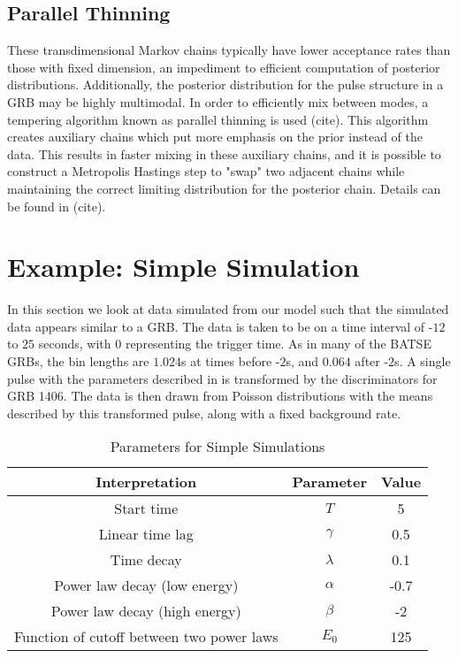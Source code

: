\documentclass[12pt,letterpaper]{article}
\begin{document}


    

   
    \subsection{Parallel Thinning}
    These transdimensional Markov chains typically have lower acceptance rates than those with fixed dimension, an impediment to efficient computation of posterior distributions. Additionally, the posterior distribution for the pulse structure in a GRB may be highly multimodal. In order to efficiently mix between modes, a tempering algorithm known as parallel thinning is used (cite). This algorithm creates auxiliary chains which put more emphasis on the prior instead of the data. This results in faster mixing in these auxiliary chains, and it is possible to construct a Metropolis Hastings step to "swap" two adjacent chains while maintaining the correct limiting distribution for the posterior chain. Details can be found in (cite).
%     
% 
 \section{Example: Simple Simulation}

In this section we look at data simulated from our model such that the simulated data appears similar to a GRB. The data is taken to be on a time interval of -$12$ to $25$ seconds, with $0$ representing the trigger time. As in many of the BATSE GRBs, the bin lengths are $1.024$s at times before -$2$s, and $0.064$ after -$2$s. A single pulse with the parameters described in  is transformed by the discriminators for GRB 1406. The data is then drawn from Poisson distributions with the means described by this transformed pulse, along with a fixed background rate.  
\begin{table}
\centering
 \begin{tabular}{|c |c |c|}
\hline
  Interpretation & Parameter & Value \\
\hline
  Start time & $T$ & 5 \\
  Linear time lag & $\gamma$ &0.5 \\
   Time decay & $\lambda$ & 0.1 \\ 
  Power law decay (low energy) & $\alpha$ & -0.7 \\
  Power law decay (high energy) & $\beta$ & -2 \\
  Function of cutoff between two power laws & $E_0$ & 125 \\
\hline
 \end{tabular}
\caption{Parameters for Simple Simulations}
\label{grb2d-simple-param}
\end{table}
\end{document}
